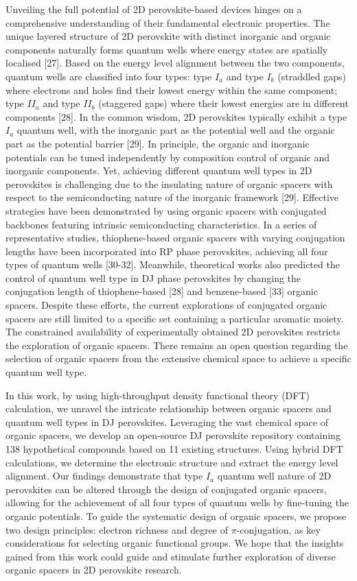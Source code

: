 Unveiling the full potential of 2D perovskite-based devices hinges on a comprehensive understanding of their fundamental electronic properties. The unique layered structure of 2D perovskite with distinct inorganic and organic components naturally forms quantum wells where energy states are spatially localised [27]. Based on the energy level alignment between the two components, quantum wells are classified into four types: type $I_a$ and type $I_b$ (straddled gaps) where electrons and holes find their lowest energy within the same component; type $II_a$ and type $II_b$ (staggered gaps) where their lowest energies are in different components [28]. In the common wisdom, 2D perovskites typically exhibit a type $I_a$ quantum well, with the inorganic part as the potential well and the organic part as the potential barrier [29]. In principle, the organic and inorganic potentials can be tuned independently by composition control of organic and inorganic components. Yet, achieving different quantum well types in 2D perovskites is challenging due to the insulating nature of organic spacers with respect to the semiconducting nature of the inorganic framework [29]. Effective strategies have been demonstrated by using organic spacers with conjugated backbones featuring intrinsic semiconducting characteristics. In a series of representative studies, thiophene-based organic spacers with varying conjugation lengths have been incorporated into RP phase perovskites, achieving all four types of quantum wells [30-32]. Meanwhile, theoretical works also predicted the control of quantum well type in DJ phase perovskites by changing the conjugation length of thiophene-based [28] and benzene-based [33] organic spacers. Despite these efforts, the current explorations of conjugated organic spacers are still limited to a specific set containing a particular aromatic moiety. The constrained availability of experimentally obtained 2D perovskites restricts the exploration of organic spacers. There remains an open question regarding the selection of organic spacers from the extensive chemical space to achieve a specific quantum well type. 

In this work, by using high-throughput density functional theory (DFT) calculation, we unravel the intricate relationship between organic spacers and quantum well types in DJ perovskites. Leveraging the vast chemical space of organic spacers, we develop an open-source DJ perovskite repository containing 138 hypothetical compounds based on 11 existing structures. Using hybrid DFT calculations, we determine the electronic structure and extract the energy level alignment. Our findings demonstrate that type $I_a$ quantum well nature of 2D perovskites can be altered through the design of conjugated organic spacers, allowing for the achievement of all four types of quantum wells by fine-tuning the organic potentials. To guide the systematic design of organic spacers, we propose two design principles: electron richness and degree of $\pi$-conjugation, as key considerations for selecting organic functional groups. We hope that the insights gained from this work could guide and stimulate further exploration of diverse organic spacers in 2D perovskite research. 

